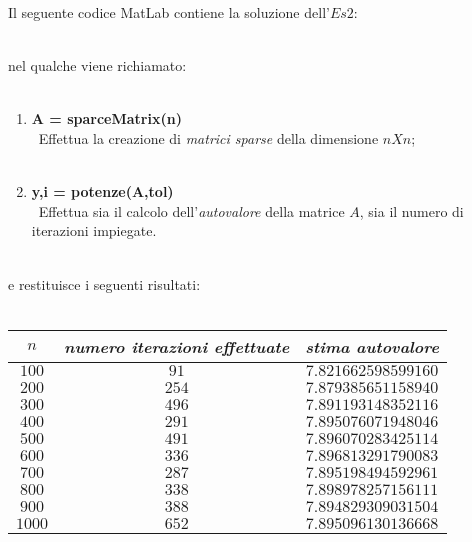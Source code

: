 Il seguente codice MatLab contiene la soluzione dell'$Es 2$:\\\
	
nel qualche viene richiamato:\\\
	\begin{enumerate}
		\item \textbf{A = sparceMatrix(n)}\\\
			Effettua la creazione di \textit{matrici sparse} della dimensione $nXn$;\\\
		\item \textbf{y,i = potenze(A,tol)}\\\
			Effettua sia il calcolo dell'\textit{autovalore} della matrice $A$, sia il numero di iterazioni impiegate.\\\
				
	\end{enumerate}
e restituisce i seguenti risultati:\\\
	\begin{center}
		\begin{tabular}{|c|c|c|}
			\hline
				$n$ & \textit{numero iterazioni effettuate} & \textit{stima autovalore} \\
			\hline
				$100$ & $91$ & $7.821662598599160$ \\
				$200$ & $254$ & $7.879385651158940$ \\
				$300$ & $496$ & $7.891193148352116$ \\
				$400$ & $291$ & $7.895076071948046$ \\
				$500$ & $491$ & $7.896070283425114$ \\
				$600$ & $336$ & $7.896813291790083$ \\
				$700$ & $287$ & $7.895198494592961$ \\
				$800$ & $338$ & $7.898978257156111$ \\
				$900$ & $388$ & $7.894829309031504$ \\
				$1000$ & $652$ & $7.895096130136668$ \\
			\hline 
		\end{tabular}
	\end{center}